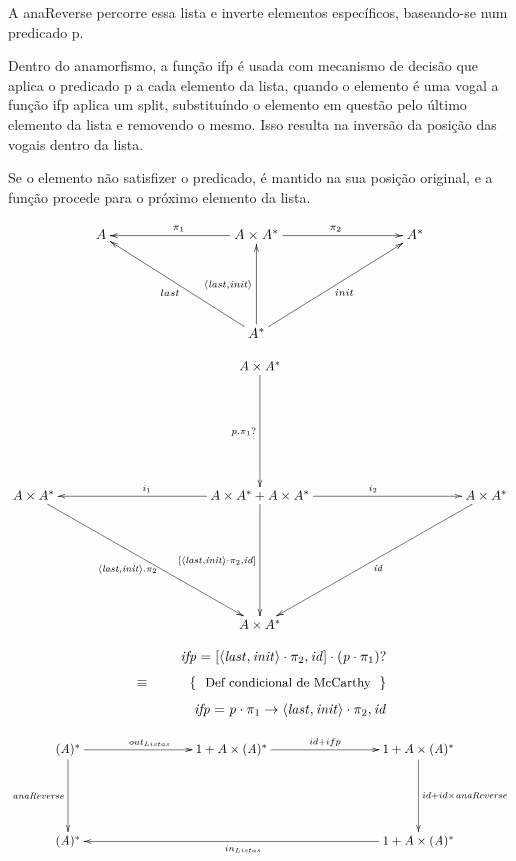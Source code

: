 \documentclass[11pt, a4paper, fleqn]{article}
\newcommand{\Conid}[1]{\mathit{#1}}
\newcommand{\Varid}[1]{\mathit{#1}}
\begin{document}
A anaReverse percorre essa lista e inverte elementos específicos, baseando-se num predicado p.

Dentro do anamorfismo, a função ifp é usada com mecanismo de decisão que aplica o 
predicado p a cada elemento da lista, quando o elemento é uma vogal a função ifp aplica um
split, substituíndo o elemento em questão pelo último elemento da lista e removendo o mesmo. 
Isso resulta na inversão da posição das vogais dentro da lista. 

Se o elemento não satisfizer o predicado, é mantido na sua posição original, e a função procede para o 
próximo elemento da lista.

\begin{eqnarray*}
\xymatrix@C=3cm @R=2cm{
     A & \ar[l]_{\pi_1} A \times A^* \ar[r]^{\pi_2} & A^*  \\
     & A^* \ar[u]^{\ensuremath{\conj{\Varid{last}}{\Varid{init}}}} \ar[ul]^{last} \ar[ur]_{init} &
}
\end{eqnarray*}

\begin{eqnarray*}
\xymatrix@C=4cm @R=3cm{
     & A \times A^* \ar[d]_{p . \pi_1 ?} \\
     A \times A^* \ar[dr]_{\ensuremath{\conj{\Varid{last}}{\Varid{init}}} . \pi_2} & \ar[r]^{\ensuremath{i_2}} A \times A^* + A \times A^* \ar[d]_{\ensuremath{\alt{\conj{\Varid{last}}{\Varid{init}}\comp \p2}{\Varid{id}}}} \ar[l]_{\ensuremath{i_1}} & A \times A^* \ar[dl]^{\ensuremath{\Varid{id}}} \\
     & A \times A^*  &
}
\end{eqnarray*}

\begin{eqnarray*}
\start
\ensuremath{\Varid{ifp}\mathrel{=}\alt{\conj{\Varid{last}}{\Varid{init}}\comp \p2}{\Varid{id}}\comp (\Varid{p}\comp \p1)\mathbin{?}}
\just\equiv{ Def condicional de McCarthy }
\ensuremath{\Varid{ifp}\mathrel{=}\mcond{\Varid{p}\comp \p1}{\conj{\Varid{last}}{\Varid{init}}\comp \p2}{\Varid{id}}}
\end{eqnarray*}

\begin{eqnarray*}
\xymatrix@C=3cm @R=2cm{
     \mathbb{(\ensuremath{\Conid{A}})^*}\ar[r]^{out_{Listas}}\ar[d]_{\ensuremath{\Varid{anaReverse}}} & 1 + A \times{\mathbb{(\ensuremath{\Conid{A}})^*}}\ar[r]^{id + ifp} & 1 + A \times{\mathbb{(\ensuremath{\Conid{A}})^*}}\ar[d]^{id +id \times{\ensuremath{\Varid{anaReverse}}}} \\
     (\ensuremath{\Conid{A}})^* && 1 + A \times{\mathbb{(\ensuremath{\Conid{A}})^*}}\ar[ll]^{ in_{Listas}} 
 }
\end{eqnarray*}
\end{document}
